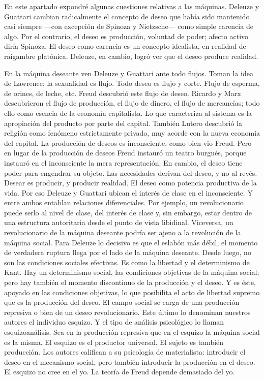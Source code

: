 En este apartado expondré algunas cuestiones relativas a las máquinas. Deleuze y Guattari cambian radicalmente el concepto de deseo que había sido mantenido casi siempre ---con excepción de Spinoza y Nietzsche--- como simple carencia de algo. Por el contrario, el deseo es producción, voluntad de poder; afecto activo diría Spinoza. El deseo como carencia es un concepto idealista, en realidad de raigambre platónica. Deleuze, en cambio, logró ver que el deseo produce realidad.

En la máquina deseante ven Deleuze y Guattari ante todo flujos. Toman la idea de Lawrence: la sexualidad es flujo. Todo deseo es flujo y corte. Flujo de esperma, de orines, de leche, etc. Freud descubrió este flujo de deseo. Ricardo y Marx descubrieron el flujo de producción, el flujo de dinero, el flujo de mercancías; todo ello como esencia de la economía capitalista. Lo que caracteriza al sistema es la apropiación del producto por parte del capital. También Lutero descubrió la religión como fenómeno estrictamente privado, muy acorde con la nueva economía del capital. La producción de deseos es inconsciente, como bien vio Freud. Pero en lugar de la producción de deseos Freud instauró un teatro burgués, porque instauró en el inconsciente la mera representación. En cambio, el deseo tiene poder para engendrar su objeto. Las necesidades derivan del deseo, y no al revés. Desear es producir, y producir realidad. El deseo como potencia productiva de la vida. Por eso Deleuze y Guattari ubican el interés de clase en el inconsciente. Y entre ambos entablan relaciones diferenciales. Por ejemplo, un revolucionario puede serlo al nivel de clase, del interés de clase y, sin embargo, estar dentro de una estructura autoritaria desde el punto de vista libidinal. Viceversa, un revolucionario de la máquina deseante podría ser ajeno a la revolución de la máquina social. Para Deleuze lo decisivo es que el eslabón más débil, el momento de verdadera ruptura llega por el lado de la máquina deseante. Desde luego, no son las condiciones sociales efectivas. Es como la libertad y el determinismo de Kant. Hay un determinismo social, las condiciones objetivas de la máquina social; pero hay también el momento discontinuo de la producción y el deseo. Y es éste, apoyado en las condiciones objetivas, lo que posibilita el acto de libertad supremo que es la producción del deseo. El campo social se carga de una producción represiva o bien de un deseo revolucionario. Este último lo denominan nuestros autores el individuo esquizo. Y el tipo de análisis psicológico lo llaman esquizoanálisis. Sea en la producción represiva que en el esquizo la máquina social es la misma. El esquizo es el productor universal. El sujeto es también producción. Los autores califican a su psicología de materialista: introducir el deseo en el mecanismo social, pero también introducir la producción en el deseo. El esquizo no cree en el yo. La teoría de Freud depende demasiado del yo.

